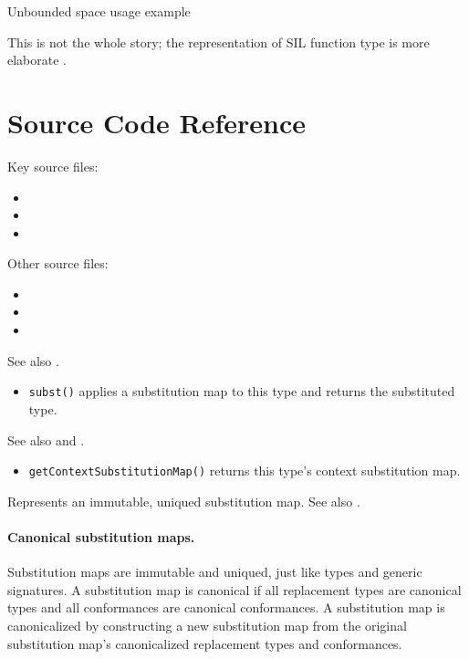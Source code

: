 \documentclass[../generics]{subfiles}
\begin{document}
\begin{example}
Unbounded space usage example
\end{example}

This is not the whole story; the representation of SIL function type is more elaborate \cite{substfunctype}.

\section{Source Code Reference}\label{substmapsourcecoderef}

Key source files:
\begin{itemize}
\item {}
\item {}
\item {}
\end{itemize}
Other source files:
\begin{itemize}
\item {}
\item {}
\item {}
\end{itemize}

See also .
\begin{itemize}
\item \texttt{subst()} applies a substitution map to this type and returns the substituted type.
\end{itemize}

See also  and .
\begin{itemize}
\item \texttt{getContextSubstitutionMap()} returns this type's context substitution map.
\end{itemize}

Represents an immutable, uniqued substitution map. See also .

\paragraph{Canonical substitution maps.}
%
%
%
%
Substitution maps are immutable and uniqued, just like types and generic signatures. A substitution map is canonical if all replacement types are canonical types and all conformances are canonical conformances. A substitution map is canonicalized by constructing a new substitution map from the original substitution map's canonicalized replacement types and conformances.
\end{document}
